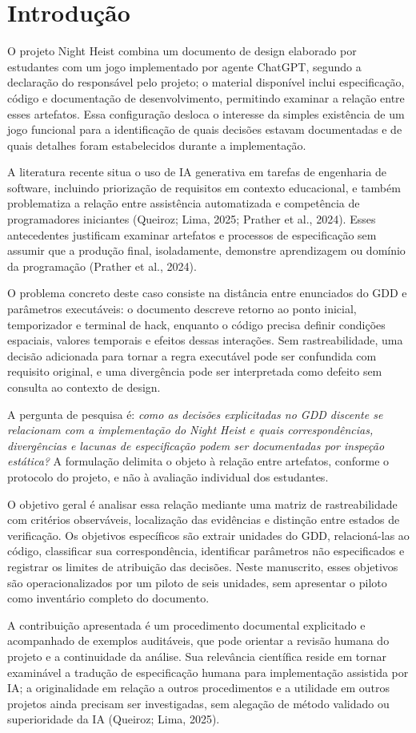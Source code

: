 \section{Introdução}
O projeto Night Heist combina um documento de design elaborado por estudantes com um jogo implementado por agente ChatGPT, segundo a declaração do responsável pelo projeto; o material disponível inclui especificação, código e documentação de desenvolvimento, permitindo examinar a relação entre esses artefatos. Essa configuração desloca o interesse da simples existência de um jogo funcional para a identificação de quais decisões estavam documentadas e de quais detalhes foram estabelecidos durante a implementação.

A literatura recente situa o uso de IA generativa em tarefas de engenharia de software, incluindo priorização de requisitos em contexto educacional, e também problematiza a relação entre assistência automatizada e competência de programadores iniciantes (Queiroz; Lima, 2025; Prather et al., 2024). Esses antecedentes justificam examinar artefatos e processos de especificação sem assumir que a produção final, isoladamente, demonstre aprendizagem ou domínio da programação (Prather et al., 2024).

O problema concreto deste caso consiste na distância entre enunciados do GDD e parâmetros executáveis: o documento descreve retorno ao ponto inicial, temporizador e terminal de hack, enquanto o código precisa definir condições espaciais, valores temporais e efeitos dessas interações. Sem rastreabilidade, uma decisão adicionada para tornar a regra executável pode ser confundida com requisito original, e uma divergência pode ser interpretada como defeito sem consulta ao contexto de design.

A pergunta de pesquisa é: \emph{como as decisões explicitadas no GDD discente se relacionam com a implementação do Night Heist e quais correspondências, divergências e lacunas de especificação podem ser documentadas por inspeção estática?} A formulação delimita o objeto à relação entre artefatos, conforme o protocolo do projeto, e não à avaliação individual dos estudantes.

O objetivo geral é analisar essa relação mediante uma matriz de rastreabilidade com critérios observáveis, localização das evidências e distinção entre estados de verificação. Os objetivos específicos são extrair unidades do GDD, relacioná-las ao código, classificar sua correspondência, identificar parâmetros não especificados e registrar os limites de atribuição das decisões. Neste manuscrito, esses objetivos são operacionalizados por um piloto de seis unidades, sem apresentar o piloto como inventário completo do documento.

A contribuição apresentada é um procedimento documental explicitado e acompanhado de exemplos auditáveis, que pode orientar a revisão humana do projeto e a continuidade da análise. Sua relevância científica reside em tornar examinável a tradução de especificação humana para implementação assistida por IA; a originalidade em relação a outros procedimentos e a utilidade em outros projetos ainda precisam ser investigadas, sem alegação de método validado ou superioridade da IA (Queiroz; Lima, 2025).
